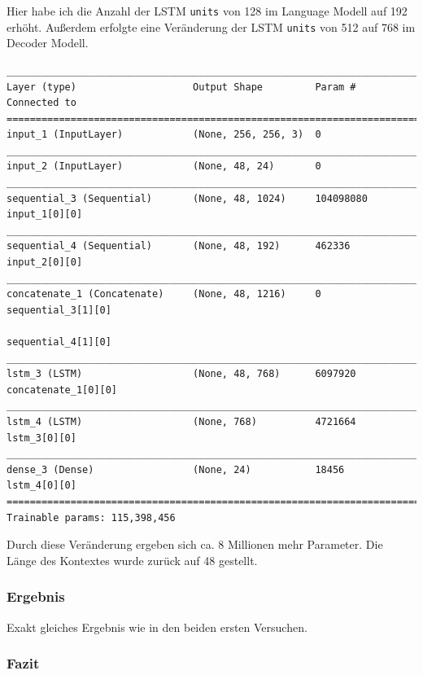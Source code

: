 \documentclass[pdftex,a4paper,halfparskip, article]{scrartcl}
\begin{document}
Hier habe ich die Anzahl der LSTM \texttt{units} von 128 im Language Modell auf 192 erhöht. Außerdem erfolgte eine Veränderung der LSTM \texttt{units} von 512 auf 768 im Decoder Modell.

\begin{verbatim}
_____________________________________________________________________________
Layer (type)                    Output Shape         Param #     Connected to
=============================================================================
input_1 (InputLayer)            (None, 256, 256, 3)  0
_____________________________________________________________________________
input_2 (InputLayer)            (None, 48, 24)       0
_____________________________________________________________________________
sequential_3 (Sequential)       (None, 48, 1024)     104098080   input_1[0][0]
_____________________________________________________________________________
sequential_4 (Sequential)       (None, 48, 192)      462336      input_2[0][0]
_____________________________________________________________________________
concatenate_1 (Concatenate)     (None, 48, 1216)     0           sequential_3[1][0]
                                                                 sequential_4[1][0]
_____________________________________________________________________________
lstm_3 (LSTM)                   (None, 48, 768)      6097920     concatenate_1[0][0]
_____________________________________________________________________________
lstm_4 (LSTM)                   (None, 768)          4721664     lstm_3[0][0]
_____________________________________________________________________________
dense_3 (Dense)                 (None, 24)           18456       lstm_4[0][0]
=============================================================================
Trainable params: 115,398,456

\end{verbatim}

Durch diese Veränderung ergeben sich ca. 8 Millionen mehr Parameter.
Die Länge des Kontextes wurde zurück auf 48 gestellt.

\subsubsection*{Ergebnis}

Exakt gleiches Ergebnis wie in den beiden ersten Versuchen.

\subsubsection*{Fazit}
\end{document}
